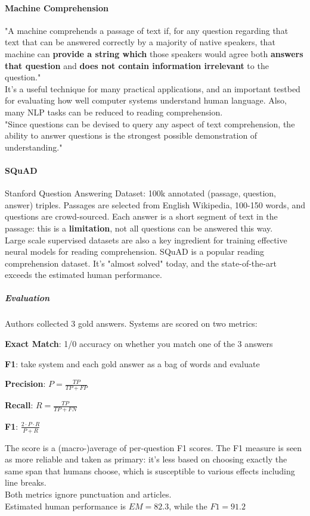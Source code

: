 \documentclass[10pt]{report}
\begin{document}
\paragraph{Machine Comprehension} "A machine comprehends a passage of text if, for any question regarding that text that can be answered correctly by a majority of native speakers, that machine can \textbf{provide a string which} those speakers would agree both \textbf{answers that question} and \textbf{does not contain information irrelevant} to the question."\\
It's a useful technique for many practical applications, and an important testbed for evaluating how well computer systems understand human language. Also, many NLP tasks can be reduced to reading comprehension.\\
"Since questions can be devised to query any aspect of text comprehension, the ability to answer questions is the strongest possible demonstration of understanding."
\paragraph{SQuAD} Stanford Question Answering Dataset: 100k annotated (passage, question, answer) triples. Passages are selected from English Wikipedia, 100-150 words, and questions are crowd-sourced. Each answer is a short segment of text in the passage: this is a \textbf{limitation}, not all questions can be answered this way.\\
Large scale supervised datasets are also a key ingredient for training effective neural models for reading comprehension. SQuAD is a popular reading comprehension dataset. It's "almost solved" today, and the state-of-the-art exceeds the estimated human performance.
\subparagraph{Evaluation} Authors collected 3 gold answers. Systems are scored on two metrics:
\begin{list}{}{}
	\item \textbf{Exact Match}: 1/0 accuracy on whether you match one of the 3 answers
	\item \textbf{F1}: take system and each gold answer as a bag of words and evaluate
	\begin{list}{}{}
		\item \textbf{Precision}: $P= \frac{TP}{TP+FP}$
		\item \textbf{Recall}: $R=\frac{TP}{TP+FN}$
		\item \textbf{F1}: $\frac{2\cdot P\cdot R}{P + R}$
	\end{list}
\end{list}
The score is a (macro-)average of per-question F1 scores. The F1 measure is seen as more reliable and taken as primary: it's less based on choosing exactly the same span that humans choose, which is susceptible to various effects including line breaks.\\
Both metrics ignore punctuation and articles.\\
Estimated human performance is $EM=82.3$, while the $F1=91.2$
\end{document}
